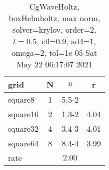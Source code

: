 \begin{table}[H]\tableFont %
\begin{center}
\begin{tabular}{|l|c|c|c|} \hline 
grid  & N &  $ u $ & r \\ \hline 
   square8 &     1 & \num{5.5}{-2} &        \\ \hline
  square16 &     2 & \num{1.3}{-2} &  4.04  \\ \hline
  square32 &     4 & \num{3.4}{-3} &  4.01  \\ \hline
  square64 &     8 & \num{8.4}{-4} &  3.99  \\ \hline
    rate             &       &  $2.00$       &       \\ \hline
\end{tabular}
\caption{CgWaveHoltz, boxHelmholtz, max norm, solver=krylov, order=$2$, $t=0.5$, cfl=$0.9$, ad4=$1$, omega=2, tol=1e-05 Sat May 22 06:17:07 2021}\label{table:boxHelmholtzkrylovOrder2max}
\end{center}
\end{table}
